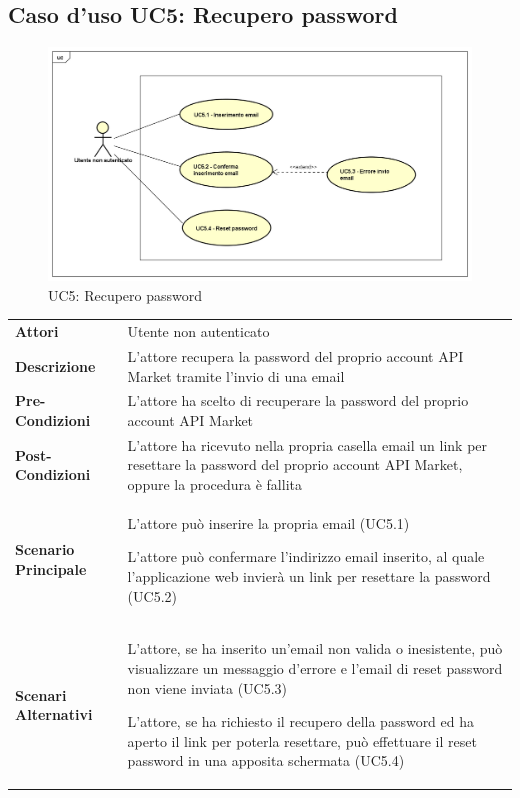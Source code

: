 \newpage
\subsection{Caso d'uso UC5: Recupero password}
\label{UC5}
\begin{figure}[ht]
	\centering
	\includegraphics[scale=0.45]{UML/UC5.png}
	\caption{UC5: Recupero password}
\end{figure}

\begin{longtable}{ l | p{11cm}}
	\hline
	\rowcolor{Gray}
	 \multicolumn{2}{c}{UC5 - Recupero password} \\
	 \hline
	\textbf{Attori} & Utente non autenticato \\
	\textbf{Descrizione} & L'attore recupera la password del proprio account API Market tramite l'invio di una email \\
	\textbf{Pre-Condizioni} & L'attore ha scelto di recuperare la password del proprio account API Market \\
	\textbf{Post-Condizioni} & L'attore ha ricevuto nella propria casella email un link per resettare la password del proprio account API Market, oppure la procedura è fallita \\
	\textbf{Scenario Principale} & 
	\begin{enumerate*}[label=(\arabic*.),itemjoin={\newline}]
		\item L'attore può inserire la propria email (UC5.1)
		\item L'attore può confermare l'indirizzo email inserito, al quale l'applicazione web invierà un link per resettare la password (UC5.2)
	\end{enumerate*}\\
	\textbf{Scenari Alternativi} & 
	\begin{enumerate*}[label=(\arabic*.),itemjoin={\newline}]
		\item L'attore, se ha inserito un'email non valida o inesistente, può visualizzare un messaggio d'errore e l'email di reset password non viene inviata (UC5.3)
		\item L'attore, se ha richiesto il recupero della password ed ha aperto il link per poterla resettare, può effettuare il reset password in una apposita schermata (UC5.4)
	\end{enumerate*}\\
\end{longtable}


